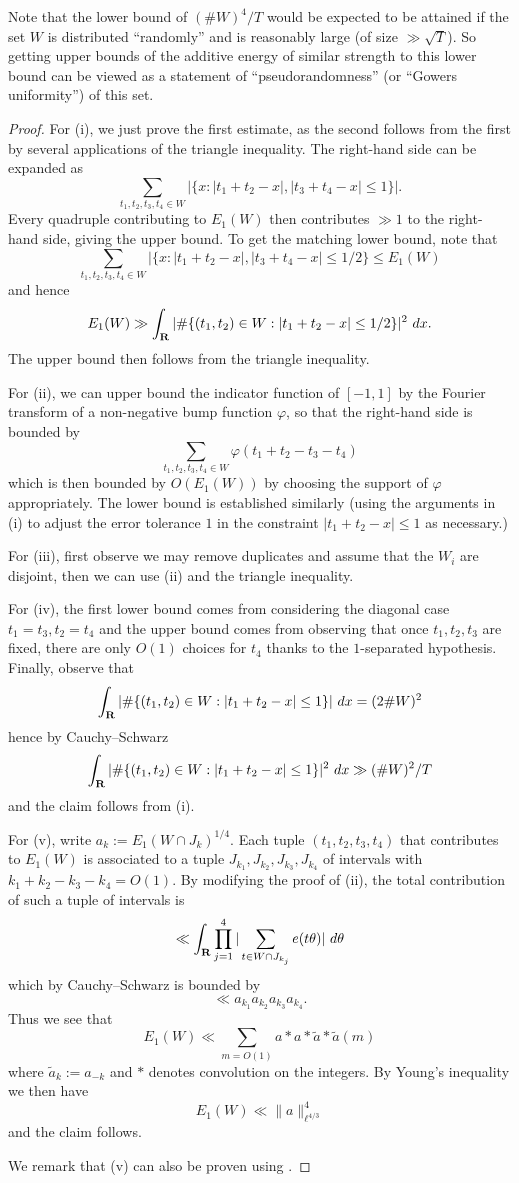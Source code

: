 Note that the lower bound of $(\# W)^4 / T$ would be expected to be attained if the set $W$ is distributed ``randomly'' and is reasonably large (of size $\gg \sqrt{T}$).  So  getting upper bounds of the additive energy of similar strength to this lower bound can be viewed as a statement of ``pseudorandomness'' (or ``Gowers uniformity'') of this set.

\begin{proof} For (i), we just prove the first estimate, as the second follows from the first by several applications of the triangle inequality.  The right-hand side can be expanded as
    $$ \sum_{t_1,t_2,t_3,t_4 \in W} |\{ x: |t_1+t_2-x|, |t_3+t_4-x| \leq 1 \}|.$$
Every quadruple contributing to $E_1(W)$ then contributes $\gg 1$ to the right-hand side, giving the upper bound.  To get the matching lower bound, note that
$$ \sum_{t_1,t_2,t_3,t_4 \in W} |\{ x: |t_1+t_2-x|, |t_3+t_4-x| \leq 1/2 \} \leq E_1(W)$$
and hence
$$ E_1(W) \gg \int_{\mathbf{R}} |\# \{ (t_1,t_2) \in W: |t_1+t_2 - x| \leq 1/2\} |^2\ dx.$$
The upper bound then follows from the triangle inequality.

For (ii), we can upper bound the indicator function of $[-1,1]$ by the Fourier transform of a non-negative bump function $\varphi$, so that the right-hand side is bounded by
$$ \sum_{t_1,t_2,t_3,t_4 \in W} \varphi(t_1+t_2-t_3-t_4)$$
which is then bounded by $O(E_1(W))$ by choosing the support of $\varphi$ appropriately.  The lower bound is established similarly (using the arguments in (i) to adjust the error tolerance $1$ in the constraint $ |t_1+t_2 - x| \leq 1$ as necessary.)

For (iii), first observe we may remove duplicates and assume that the $W_i$ are disjoint, then we can use (ii) and the triangle inequality.

For (iv), the first lower bound comes from considering the diagonal case $t_1=t_3, t_2 = t_4$ and the upper bound comes from observing that once $t_1,t_2,t_3$ are fixed, there are only $O(1)$ choices for $t_4$ thanks to the $1$-separated hypothesis.  Finally, observe that
$$ \int_{\mathbf{R}} |\# \{ (t_1,t_2) \in W: |t_1+t_2 - x| \leq 1\} |\ dx = (2 \# W)^2$$
hence by Cauchy--Schwarz
$$ \int_{\mathbf{R}} |\# \{ (t_1,t_2) \in W: |t_1+t_2 - x| \leq 1\} |^2\ dx \gg (\# W)^2/T$$
and the claim follows from (i).

For (v), write $a_k := E_1(W \cap J_k)^{1/4}$.  Each tuple $(t_1,t_2,t_3,t_4)$ that contributes to $E_1(W)$ is associated to a tuple $J_{k_1}, J_{k_2}, J_{k_3}, J_{k_4}$ of intervals with $k_1+k_2-k_3-k_4=O(1)$.  By modifying the proof of (ii), the total contribution of such a tuple of intervals is
$$ \ll \int_{\mathbf{R}} \prod_{j=1}^4 |\sum_{t \in W \cap J_{k_j}} e(t\theta)|\ d\theta$$
which by Cauchy--Schwarz is bounded by
$$ \ll a_{k_1} a_{k_2} a_{k_3} a_{k_4}.$$
Thus we see that
$$ E_1(W) \ll \sum_{m=O(1)} a * a * \tilde a * \tilde a(m)$$
where $\tilde a_k := a_{-k}$ and $*$ denotes convolution on the integers.  By Young's inequality we then have
$$ E_1(W) \ll \|a\|_{\ell^{4/3}}^4$$
and the claim follows.

We remark that (v) can also be proven using \cite[Lemma 4.8, (4.2)]{cladek-tao}.
\end{proof}

